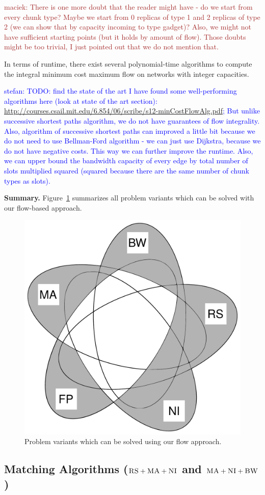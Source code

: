 \documentclass[9pt]{sigcomm-alternate}
\newcommand{\maciek}[1]{\textcolor{brown}{maciek: #1}}
\newcommand{\stefan}[1]{\textcolor{blue}{stefan: #1}}
\newcommand{\CC}{\textsc{NI}}
\newcommand{\RS}{\textsc{RS}}
\newcommand{\BW}{\textsc{BW}}
\newcommand{\MA}{\textsc{MA}}
\begin{document}
\maciek{There is one more doubt that the reader might have - do we
  start from every chunk type? Maybe we start from 0 replicas of type
  1 and 2 replicas of type 2 (we can show that by capacity incoming to
  type gadget)? Also, we might not have sufficient
  starting points (but it holds by amount of flow). Those doubts might
  be too trivial, I just pointed out that we do not mention that.} 

In terms of runtime, there exist several polynomial-time algorithms to compute
the integral minimum cost maximum flow on networks with integer capacities.

\stefan{TODO: find the state of the art
I have found some well-performing algorithms here (look at state of the art section):
  \url{http://courses.csail.mit.edu/6.854/06/scribe/s12-minCostFlowAlg.pdf}; But unlike successive shortest paths algorithm, we do not have guarantees of flow integrality.
Also, algorithm of successive shortest paths can improved a little bit because we do not need to use Bellman-Ford algorithm - we can just use Dijkstra, because we do not have negative costs. This way we can further improve the runtime.
Also, we can upper bound the bandwidth capacity of every edge by total number of slots multiplied squared (squared because there are the same number of chunk types as slots).
}

\textbf{Summary.}
Figure~\ref{fig:venn_flow} summarizes all problem
variants which can be solved with our flow-based approach.
\begin{figure}
\includegraphics[width=0.48\columnwidth]{figs/venn_flow.pdf}
\caption{Problem variants which can be solved using our flow approach.}
\label{fig:venn_flow}
\end{figure}


\subsection{Matching Algorithms ($\RS+\MA+\CC$ and $\MA+\CC+\BW$)}\label{ssec:match}
\end{document}
